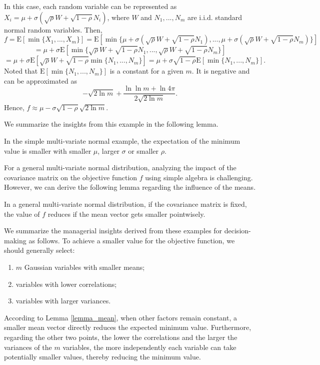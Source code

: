 \documentclass[opre,sglanonrev]{informs4}
\begin{document}
In this case, each random variable can be represented as $X_i = \mu + \sigma(\sqrt{\rho}W + \sqrt{1-\rho} N_i )$, where $W$ and $N_1,...,N_m$ are i.i.d. standard normal random variables. Then,
$$f = \text{E}[\min\{X_1,...,X_m\}] =  \text{E}[\min\{\mu + \sigma(\sqrt{\rho}W + \sqrt{1-\rho} N_1 ),...,\mu + \sigma(\sqrt{\rho}W + \sqrt{1-\rho} N_m )\}] $$
$$=\mu+ \sigma\text{E}[\min\{\sqrt{\rho}W + \sqrt{1-\rho} N_1 ,...,\sqrt{\rho}W + \sqrt{1-\rho} N_m \}]  $$
$$=\mu + \sigma\text{E}[\sqrt{\rho}W+ \sqrt{1-\rho} \min\{N_1,...,N_m\} ] =\mu + \sigma\sqrt{1-\rho} \text{E}[\min\{N_1,...,N_m\} ]. $$
Noted that $\text{E}[\min\{N_1 ,...,N_m \}]$ is a constant for a given $m$. It is negative and can be approximated as 
$$-\sqrt{2 \ln m} + \frac{\ln \ln m + \ln 4\pi}{ 2 \sqrt{2 \ln m}}. $$
Hence, $f\approx \mu - \sigma\sqrt{1-\rho}\sqrt{2 \ln m}$. 

We summarize the insights from this example in the following lemma.

\begin{lemma}
	In the simple multi-variate normal example, the expectation of the minimum value is smaller with smaller $\mu$, larger $\sigma$ or smaller $\rho$.
\end{lemma}

For a general multi-variate normal distribution, analyzing the impact of the covariance matrix on the objective function $   f   $ using simple algebra is challenging. However, we can derive the following lemma regarding the influence of the means.
\begin{lemma}
\label{lemma_mean}
	In a general multi-variate normal distribution, if the covariance matrix is fixed, the value of $f$ reduces if the mean vector gets smaller pointwisely.
\end{lemma}

We summarize the managerial insights derived from these examples for decision-making as follows. To achieve a smaller value for the objective function, we should generally select: 
\begin{enumerate}
	\item $m$ Gaussian variables with smaller means;
	\item variables with lower correlations;
	\item variables with larger variances.
\end{enumerate}
According to Lemma \ref{lemma_mean}, when other factors remain constant, a smaller mean vector directly reduces the expected minimum value. Furthermore, regarding the other two points, the lower the correlations and the larger the variances of the $m$ variables, the more independently each variable can take potentially smaller values, thereby reducing the minimum value.
\end{document}
